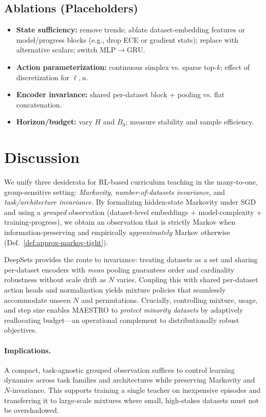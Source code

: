 \documentclass[11pt]{article}
\newcommand{\1}{\mathbf{1}}
\newcommand{\MAESTRO}{\textsc{MAESTRO}\xspace}
\begin{document}
\subsection{Ablations (Placeholders)}
\begin{itemize}[leftmargin=1.5em]
\item \textbf{State sufficiency:} remove trends; ablate dataset-embedding features or model/progress blocks (e.g., drop ECE or gradient stats); replace with alternative scalars; switch MLP$\to$GRU.
\item \textbf{Action parameterization:} continuous simplex vs. sparse top-$k$; effect of discretization for $\ell,u$.
\item \textbf{Encoder invariance:} shared per-dataset block + pooling vs. flat concatenation.
\item \textbf{Horizon/budget:} vary $H$ and $B_0$; measure stability and sample efficiency.
\end{itemize}

\section{Discussion}
We unify three desiderata for RL-based curriculum teaching in the many-to-one, group-sensitive setting: \emph{Markovity}, \emph{number-of-datasets invariance}, and \emph{task/architecture invariance}. By formalizing hidden-state Markovity under SGD and using a \emph{grouped} observation (dataset-level embeddings + model-complexity + training-progress), we obtain an observation that is strictly Markov when information-preserving and empirically \emph{approximately} Markov otherwise (Def.~\ref{def:approx-markov-tight}). 

DeepSets provides the route to invariance: treating datasets as a set and sharing per-dataset encoders with \emph{mean} pooling guarantees order and cardinality robustness without scale drift as $N$ varies. Coupling this with shared per-dataset action heads and normalization yields mixture policies that seamlessly accommodate unseen $N$ and permutations. Crucially, controlling mixture, usage, and step size enables \MAESTRO{} to \emph{protect minority datasets} by adaptively reallocating budget—an operational complement to distributionally robust objectives.

\paragraph{Implications.}
A compact, task-agnostic grouped observation suffices to control learning dynamics across task families and architectures while preserving Markovity and $N$-invariance. This supports training a single teacher on inexpensive episodes and transferring it to large-scale mixtures where small, high-stakes datasets must not be overshadowed.
\end{document}
